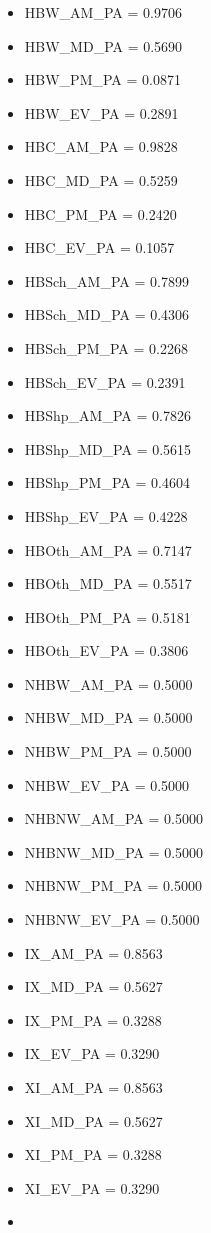 \documentclass[
  letterpaper,
  DIV=11,
  numbers=noendperiod,
  titlepage=false]{scrreprt}
\providecommand{\tightlist}{%
  \setlength{\itemsep}{0pt}\setlength{\parskip}{0pt}}\usepackage{longtable,booktabs,array}
\begin{document}
\begin{itemize}
\tightlist
\item
  HBW\_AM\_PA = 0.9706
\item
  HBW\_MD\_PA = 0.5690
\item
  HBW\_PM\_PA = 0.0871
\item
  HBW\_EV\_PA = 0.2891
\item
  HBC\_AM\_PA = 0.9828
\item
  HBC\_MD\_PA = 0.5259
\item
  HBC\_PM\_PA = 0.2420
\item
  HBC\_EV\_PA = 0.1057
\item
  HBSch\_AM\_PA = 0.7899
\item
  HBSch\_MD\_PA = 0.4306
\item
  HBSch\_PM\_PA = 0.2268
\item
  HBSch\_EV\_PA = 0.2391
\item
  HBShp\_AM\_PA = 0.7826
\item
  HBShp\_MD\_PA = 0.5615
\item
  HBShp\_PM\_PA = 0.4604
\item
  HBShp\_EV\_PA = 0.4228
\item
  HBOth\_AM\_PA = 0.7147
\item
  HBOth\_MD\_PA = 0.5517
\item
  HBOth\_PM\_PA = 0.5181
\item
  HBOth\_EV\_PA = 0.3806
\item
  NHBW\_AM\_PA = 0.5000
\item
  NHBW\_MD\_PA = 0.5000
\item
  NHBW\_PM\_PA = 0.5000
\item
  NHBW\_EV\_PA = 0.5000
\item
  NHBNW\_AM\_PA = 0.5000
\item
  NHBNW\_MD\_PA = 0.5000
\item
  NHBNW\_PM\_PA = 0.5000
\item
  NHBNW\_EV\_PA = 0.5000
\item
  IX\_AM\_PA = 0.8563
\item
  IX\_MD\_PA = 0.5627
\item
  IX\_PM\_PA = 0.3288
\item
  IX\_EV\_PA = 0.3290
\item
  XI\_AM\_PA = 0.8563
\item
  XI\_MD\_PA = 0.5627
\item
  XI\_PM\_PA = 0.3288
\item
  XI\_EV\_PA = 0.3290
\item

\end{itemize}
\end{document}
